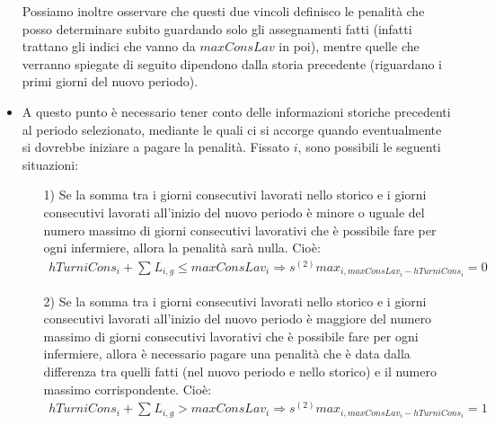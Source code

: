 \begin{itemize}
Possiamo inoltre osservare che questi due vincoli definisco le penalità che posso determinare subito guardando solo gli assegnamenti fatti (infatti trattano gli indici che vanno da $maxConsLav$ in poi), mentre quelle che verranno spiegate di seguito dipendono dalla storia precedente (riguardano i primi giorni del nuovo periodo).

\item A questo punto è necessario tener conto delle informazioni storiche precedenti al periodo selezionato, mediante le quali ci si accorge quando eventualmente si dovrebbe iniziare a pagare la penalità. Fissato $i$, sono possibili le seguenti situazioni:
\begin{enumerate}
\item [1)] Se la somma tra i giorni consecutivi lavorati nello storico e i giorni consecutivi lavorati all'inizio del nuovo periodo è minore o uguale del numero massimo di giorni consecutivi lavorativi che è possibile fare per ogni infermiere, allora la penalità sarà nulla. Cioè:
\begin{equation}
\begin{split}
hTurniCons_i + \sum_{} L_{i, g} \leq maxConsLav_i \Longrightarrow s^{(2)}max_{i, maxConsLav_i - hTurniCons_i} = 0 
\end{split}
\end{equation}

\item [2)] Se la somma tra i giorni consecutivi lavorati nello storico e i giorni consecutivi lavorati all'inizio del nuovo periodo è maggiore del numero massimo di giorni consecutivi lavorativi che è possibile fare per ogni infermiere, allora è necessario pagare una penalità che è data dalla differenza tra quelli fatti (nel nuovo periodo e nello storico) e il numero massimo corrispondente. Cioè:
\begin{equation}
\begin{split}
hTurniCons_i + \sum_{} L_{i, g} > maxConsLav_i \Longrightarrow s^{(2)}max_{i, maxConsLav_i - hTurniCons_i} = 1
\end{split}
\end{equation}
\end{enumerate}


\end{itemize}
